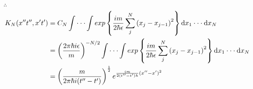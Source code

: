 \documentclass[12pt]{article}
\numberwithin{equation}{section}	 %
\begin{document}
\begin{spacing}{1.5}
$\therefore$
\begin{align*}
K_{N}(x''t'',x't') &= C_{N}\int \cdot\cdot\cdot \int exp\left\{\frac{im}{2\hbar\epsilon}\sum_{j}^{N}\left(x_{j}-x_{j-1}\right)^{2}\right\} \mathop{}\!\mathrm{d} x_{1} \cdot\cdot\cdot \mathop{}\!\mathrm{d} x_{N} \\
&= \left(\frac{2\pi\hbar i\epsilon}{m}\right)^{-N/2}\int \cdot\cdot\cdot \int exp\left\{\frac{im}{2\hbar\epsilon}\sum_{j}^{N}\left(x_{j}-x_{j-1}\right)^{2}\right\} \mathop{}\!\mathrm{d} x_{1} \cdot\cdot\cdot \mathop{}\!\mathrm{d} x_{N} \\
&= \left(\frac{m}{2\pi\hbar i(t''-t')}\right)^{\frac{1}{2}} e^{\frac{im}{2(t''-t')\hbar}(x''-x')^{2}}
\end{align*}
~\\
~\\



\newpage

\end{spacing}
\end{document}
